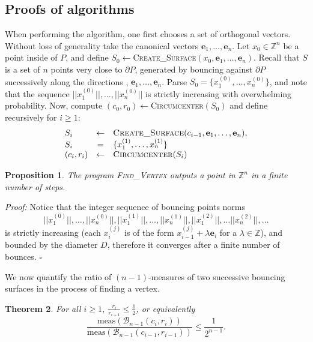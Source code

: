 \documentclass[11pt]{article}
\theoremstyle{plain}
\newtheorem{THE}{Theorem}[section]
\newtheorem{PROP}[THE]{Proposition}
\theoremstyle{definition}
\theoremstyle{remark}
\newcommand{\ZZ}{\mathbb{Z}}      %
\newcommand{\ee}{\mathbf{e}}
\begin{document}
\subsection{Proofs of algorithms}
When performing the algorithm, one first chooses a set of orthogonal vectors. Without loss of generality take the canonical vectors $\ee_1,\dots,\ee_n$. Let $x_0\in \ZZ^n$ be a point inside of $P$, and define $S_0\leftarrow$\textsc{Create\_Surface}$(x_0,\ee_1,\dots,\ee_n)$. Recall that $S$ is a set of $n$ points very close to $\partial P$, generated by bouncing against $\partial P$ successively along the directions , $\ee_1,\dots,\ee_n$. Parse $S_0=\{x_1^{(0)},\dots,x_n^{(0)}\}$, and note that the sequence $||x_1^{(0)}||,\dots,||x_n^{(0)}||$ is strictly increasing with overwhelming probability. Now, compute $(c_0,r_0)\leftarrow$\textsc{Circumcenter}$(S_0)$ and define recursively for $i\geq 1$:
$$
\begin{array}{lcl}
S_i&\leftarrow&\mbox{\sc Create\_Surface}(c_{i-1},\ee_1,\dots,\ee_n),\\
S_i&=&\{x_1^{(1)},\dots,x_n^{(1)}\}\\
(c_i,r_i)&\leftarrow&\mbox{\sc Circumcenter}(S_i)
\end{array}$$

\begin{PROP}
	 The program \textsc{Find\_Vertex} outputs a point in $\ZZ^n$ in a finite number of steps.
\end{PROP}

{\it Proof: } Notice that the integer sequence of bouncing points norms
$$||x_1^{(0)}||,\dots,||x_n^{(0)}||,||x_1^{(1)}||,\dots,||x_n^{(1)}||,||x_1^{(2)}||,\dots||x_n^{(2)}||,\dots$$  
is strictly increasing (each $x_i^{(j)}$ is of the form $x_{i-1}^{(j)}+\lambda\ee_{i}$ for a $\lambda\in \ZZ$), and bounded by the diameter $D$, therefore it converges after a finite number of bounces. $\square$
\medskip

We now quantify the ratio of $(n-1)$-measures of two successive bouncing surfaces in the process of finding a vertex.


\begin{THE}\label{thm:r/2}
	 For all $i\geq 1$, $\frac{r_{i}}{r_{i+1}} \leq \frac{1}{2}$, or equivalently
	 $$\frac{\mathrm{meas}(\mathcal{B}_{n-1}(c_i,r_i))}{\mathrm{meas}(\mathcal{B}_{n-1}(c_{i-1},r_{i-1}))}\leq  \frac{1}{2^{n-1}}.$$
\end{THE}
\end{document}
